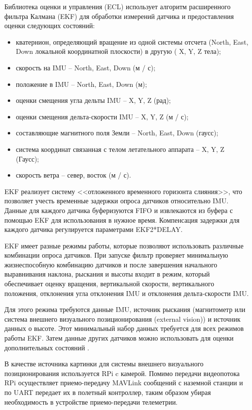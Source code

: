 Библиотека оценки и управления (ECL) использует алгоритм расширенного фильтра Калмана (EKF) для обработки измерений датчика и предоставления оценки следующих состояний:
\begin{itemize}
	\item кватернион, определяющий вращение из одной системы отсчета (North, East, Down локальной координатной плоскости) в другую ( X, Y, Z тела);
	\item скорость на IMU -- North, East, Down (м / с);
	\item положение в IMU -- North, East, Down (м);
	\item оценки смещения угла дельты IMU -- X, Y, Z (рад);
	\item оценки смещения дельта-скорости IMU -- X, Y, Z (м / с);
	\item составляющие магнитного поля Земли -- North, East, Down (гаусс);
	\item система координат связанная с телом летательного аппарата -- X, Y, Z (Гаусс);
	\item скорость ветра -- север, восток (м / с).
\end{itemize}

EKF реализует систему <<отложенного временного горизонта слияния>>, что позволяет учесть временные задержки опроса датчиков относительно IMU. Данные для каждого датчика буферизуются FIFO и извлекаются из буфера с помощью EKF для использования в нужное время. Компенсация задержки для каждого датчика регулируется параметрами EKF2*DELAY.

EKF имеет разные режимы работы, которые позволяют использовать различные комбинации опроса датчиков. При запуске фильтр проверяет минимальную жизнеспособную комбинацию датчиков и после завершения начального выравнивания наклона, рыскания и высоты входит в режим, который обеспечивает оценку вращения, вертикальной скорости, вертикального положения, отклонения угла отклонения IMU и отклонения дельта-скорости IMU.

Для этого режима требуются данные IMU, источник рыскания (магнитометр или система внешнего визуального позиционирования (external vision)) и источник данных о высоте. Этот минимальный набор данных требуется для всех режимов работы EKF. Затем данные других датчиков можно использовать для оценки дополнительных состояний \cite{px4}.

В качестве источника картинки для системы внешнего визуального позиционирования используется RPi c камерой. Помимо передачи видеопотока RPi осуществляет приемо-передачу MAVLink сообщений с наземной станции и по UART передает их в полетный контроллер, таким образом убирая необходимость в устройстве приемо-передачи телеметрии.

